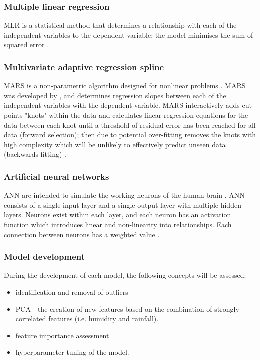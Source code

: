 \subsubsection{Multiple linear regression}
MLR is a statistical method that determines a relationship with each of the independent variables to the dependent variable; the model minimises the sum of squared error \citep{wuetal2022}.

\subsubsection{Multivariate adaptive regression spline}
MARS is a non-parametric algorithm designed for nonlinear problems \citep{wuetal2022}. MARS was developed by \cite{friedman1991}, and determines regression slopes between each of the independent variables with  the dependent variable. MARS interactively adds cut-points "knots" within the data and calculates linear regression equations for the data between each knot until a threshold  of residual error has been reached for all data (forward selection); then due to potential over-fitting removes the knots with high complexity which will be unlikely to effectively predict unseen data (backwards fitting) \citep{wuetal2022}.

\subsubsection{Artificial neural networks}
ANN are intended to simulate the working neurons of the human brain \citep{wuetal2022}. ANN consists of a single input layer and a single output layer with multiple hidden layers. Neurons exist within each layer, and each neuron has an activation function which introduces linear and non-linearity into relationships. Each connection between neurons has a weighted value \citep{wuetal2022}.


\subsubsection{Model development}
During the development of each model, the following concepts will be assessed:

\begin{itemize}

    \item identification and removal of outliers
    \item PCA - the creation of new features based on the combination of strongly correlated features (i.e. humidity and rainfall).
    \item feature importance assessment
    \item hyperparameter tuning of the model.
\end{itemize}

